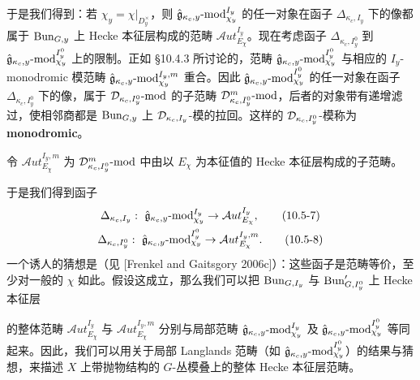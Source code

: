 
于是我们得到：若 $\chi_y=\chi|_{D^\times_y}$，则 $\hat{\mathfrak{g}}_{\kappa_c,y}\text{-mod}^{I_y}_{\chi_y}$ 的任一对象在函子 $\Delta_{\kappa_c,I_y}$ 下的像都属于 $\operatorname{Bun}_{G,y}$ 上 Hecke 本征层构成的范畴 $\mathcal{A}ut^{I_y}_{E_\chi}$。现在考虑函子 $\Delta_{\kappa_c,I^0_y}$ 到 $\hat{\mathfrak{g}}_{\kappa_c,y}\text{-mod}^{I^0_y}_{\chi_y}$ 上的限制。正如 §10.4.3 所讨论的，范畴 $\hat{\mathfrak{g}}_{\kappa_c,y}\text{-mod}^{I^0_y}_{\chi_y}$ 与相应的 $I_y$-monodromic 模范畴 $\hat{\mathfrak{g}}_{\kappa_c,y}\text{-mod}^{I_y,m}_{\chi_y}$ 重合。因此 $\hat{\mathfrak{g}}_{\kappa_c,y}\text{-mod}^{I^0_y}_{\chi_y}$ 的任一对象在函子 $\Delta_{\kappa_c,I^0_y}$ 下的像，属于 $\mathcal{D}_{\kappa_c,I^0_y}\text{-mod}$ 的子范畴 $\mathcal{D}^m_{\kappa_c,I^0_y}\text{-mod}$，后者的对象带有递增滤过，使相邻商都是 $\operatorname{Bun}_{G,y}$ 上 $\mathcal{D}_{\kappa_c,I_y}$-模的拉回。这样的 $\mathcal{D}_{\kappa_c,I^0_y}$-模称为 \textbf{monodromic}。

令 $\mathcal{A}ut^{I_y,m}_{E_\chi}$ 为 $\mathcal{D}^m_{\kappa_c,I^0_y}\text{-mod}$ 中由以 $E_\chi$ 为本征值的 Hecke 本征层构成的子范畴。

于是我们得到函子
\begin{gather}
    \Delta_{\kappa_c,I_y}:\ \gghat_{\kappa_c,y}\text{-mod}^{I_y}_{\chi_y}
    \to \mathcal{A}ut^{I_y}_{E_\chi},
    \tag{10.5-7}\\
    \Delta_{\kappa_c,I^0_y}:\ \gghat_{\kappa_c,y}\text{-mod}^{I^0_y}_{\chi_y}
    \to \mathcal{A}ut^{I_y,m}_{E_\chi}.
    \tag{10.5-8}
\end{gather}
一个诱人的猜想是（见 [Frenkel and Gaitsgory 2006c]）：这些函子是范畴等价，至少对一般的 $\chi$ 如此。假设这成立，那么我们可以把 $\operatorname{Bun}_{G,I_y}$ 与 $\operatorname{Bun}'_{G,I^0_y}$ 上 Hecke 本征层

的整体范畴 $\mathcal{A}ut^{I_y}_{E_\chi}$ 与 $\mathcal{A}ut^{I_y,m}_{E_\chi}$ 分别与局部范畴 $\hat{\mathfrak{g}}_{\kappa_c,y}\text{-mod}^{I_y}_{\chi_y}$ 及 $\hat{\mathfrak{g}}_{\kappa_c,y}\text{-mod}^{I^0_y}_{\chi_y}$ 等同起来。因此，我们可以用关于局部 Langlands 范畴（如 $\hat{\mathfrak{g}}_{\kappa_c,y}\text{-mod}^{I^0_y}_{\chi_y}$）的结果与猜想，来描述 $X$ 上带抛物结构的 $G$-丛模叠上的整体 Hecke 本征层范畴。

